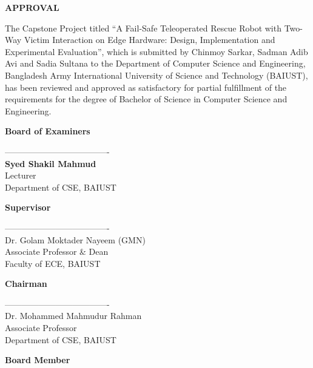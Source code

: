 \documentclass[12pt,a4paper]{report}
\begin{document}
\clearpage
\thispagestyle{plain}
\begin{center}
    \textbf{\Large APPROVAL}
\end{center}
\vspace{0.5cm}

\noindent
The Capstone Project titled ``A Fail-Safe Teleoperated Rescue Robot with Two-Way Victim Interaction on Edge Hardware: Design, Implementation and Experimental Evaluation'', which is submitted by Chinmoy Sarkar, Sadman Adib Avi and Sadia Sultana to the Department of Computer Science and Engineering, Bangladesh Army International University of
Science and Technology (BAIUST), has been reviewed and approved as satisfactory
for partial fulfillment of the requirements for the degree of Bachelor of Science in
Computer Science and Engineering.

\vspace{0.5cm}
\begin{center}
    \textbf{Board of Examiners}
\end{center}
\vspace{1.5cm}

\noindent
\begin{minipage}[t]{0.6\textwidth}
    ------------------------------------- \\
    \textbf{Syed Shakil Mahmud} \\
    Lecturer \\
    Department of CSE, BAIUST
\end{minipage}
\hfill
\begin{minipage}[t]{0.35\textwidth}
    \raggedleft
    \textbf{Supervisor}
\end{minipage}

\vspace{1.8cm}
\noindent
\begin{minipage}[t]{0.6\textwidth}
      ------------------------------------- \\
    Dr. Golam Moktader Nayeem (GMN) \\
    Associate Professor \& Dean \\
    Faculty of ECE, BAIUST
\end{minipage}
\hfill
\begin{minipage}[t]{0.35\textwidth}
    \raggedleft
    \textbf{Chairman}
\end{minipage}

\vspace{1.8cm}
\noindent
\begin{minipage}[t]{0.6\textwidth}
      ------------------------------------- \\
    Dr. Mohammed Mahmudur Rahman \\
    Associate Professor \\
    Department of CSE, BAIUST
\end{minipage}
\hfill
\begin{minipage}[t]{0.35\textwidth}
    \raggedleft
    \textbf{Board Member}
\end{minipage}
\end{document}
